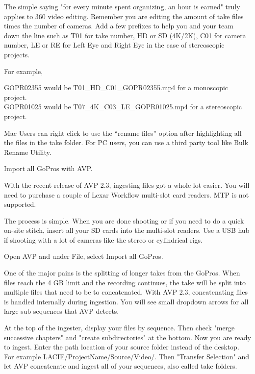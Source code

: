 \begin{fullwidth}
The simple saying "for every minute spent organizing, an hour is earned" truly applies to 360 video editing. Remember you are editing the amount of take files times the number of cameras. Add a few prefixes to help you and your team down the line such as T01 for take number, HD or SD (4K/2K), C01 for camera number, LE or RE for Left Eye and Right Eye in the case of stereoscopic projects.

For example,

GOPR02355 would be T01\_HD\_C01\_GOPR02355.mp4 for a monoscopic project.
\\
GOPR01025 would be T07\_4K\_C03\_LE\_GOPR01025.mp4 for a stereoscopic project.

\tip Mac Users can right click to use the “rename files” option after highlighting all the files in the take folder. For PC users, you can use a third party tool like Bulk Rename Utility.

{\large Import all GoPros with AVP. \par}

With the recent release of AVP 2.3, ingesting files got a whole lot easier. You will need to purchase a couple of Lexar Workflow multi-slot card readers. MTP is not supported.

The process is simple. When you are done shooting or if you need to do a quick on-site stitch, insert all your SD cards into the multi-slot readers. Use a USB hub if shooting with a lot of cameras like the stereo or cylindrical rigs.

Open AVP and under File, select Import all GoPros.


One of the major pains is the splitting of longer takes from the GoPros. When files reach the 4 GB limit and the recording continues, the take will be split into multiple files that need to be to concatenated. With AVP 2.3, concatenating files is handled internally during ingestion. You will see small dropdown arrows for all large sub-sequences that AVP detects.


At the top of the ingester, display your files by sequence. Then check "merge successive chapters" and "create subdirectories" at the bottom. Now you are ready to ingest. Enter the path location of your source folder instead of the desktop. For example LACIE/ProjectName/Source/Video/. Then "Transfer Selection" and let AVP concatenate and ingest all of your sequences, also called take folders.


\end{fullwidth}
